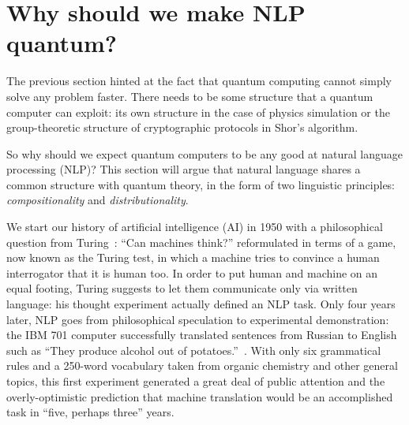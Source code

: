 
\section*{Why should we make NLP quantum?}


The previous section hinted at the fact that quantum computing cannot
simply solve any problem faster.
There needs to be some structure that a quantum computer can exploit:
its own structure in the case of physics simulation or the group-theoretic structure of cryptographic protocols in Shor's algorithm.

So why should we expect quantum computers to be any good at natural language processing (NLP)?
This section will argue that natural language shares a common structure with quantum theory, in the form of two linguistic principles: \emph{compositionality}
and \emph{distributionality}.

We start our history of artificial intelligence (AI) in 1950 with a philosophical question from Turing~\cite{Turing50}: ``Can machines think?'' reformulated in terms of a game, now known as the Turing test, in which a machine tries to convince a human interrogator that it is human too.
In order to put human and machine on an equal footing, Turing suggests to let them communicate only via written language: his thought experiment actually defined an NLP task.
Only four years later, NLP goes from philosophical speculation to experimental demonstration: the IBM 701 computer successfully translated sentences from Russian to English such as ``They produce alcohol out of potatoes.''~\cite{Hutchins04}.
With only six grammatical rules and a 250-word vocabulary taken from organic chemistry and other general topics, this first experiment generated a great deal of public attention and the overly-optimistic prediction that machine translation would be an accomplished task in ``five, perhaps three'' years.

